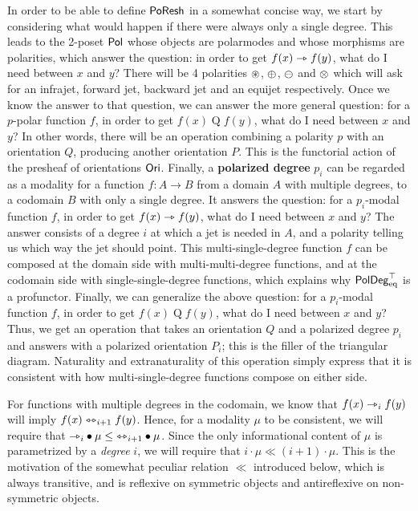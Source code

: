 \documentclass[a4paper]{memoir}
\begin{document}
In order to be able to define $\mathsf{PoResh}$ in a somewhat concise way, we start by considering what would happen if there were always only a single degree.
This leads to the 2-poset ${\mathsf{Pol}}$ whose objects are polarmodes and whose morphisms are polarities, which answer the question: in order to get $f(x) \rightarrowtriangle f(y)$, what do I need between $x$ and $y$?
There will be 4 polarities ${\oast}$, ${\oplus}$, ${\ominus}$ and ${\otimes}$ which will ask for an infrajet, forward jet, backward jet and an equijet respectively.
Once we know the answer to that question, we can answer the more general question: for a $p$-polar function $f$, in order to get $f(x) \mathrel{Q} f(y)$, what do I need between $x$ and $y$?
In other words, there will be an operation combining a polarity $p$ with an orientation $Q$, producing another orientation $P$. This is the functorial action of the presheaf of orientations ${\mathsf{Ori}}$.
Finally, a \textbf{polarized degree} $p_i$ can be regarded as a modality for a function $f : A \to B$ from a domain $A$ with multiple degrees, to a codomain $B$ with only a single degree. It answers the question: for a $p_i$-modal function $f$, in order to get $f(x) \rightarrowtriangle f(y)$, what do I need between $x$ and $y$?
The answer consists of a degree $i$ at which a jet is needed in $A$, and a polarity telling us which way the jet should point.
This multi-single-degree function $f$ can be composed at the domain side with multi-multi-degree functions, and at the codomain side with single-single-degree functions, which explains why $\mathsf{PolDeg}_{\mathrm{eq}}^\top$ is a profunctor.
Finally, we can generalize the above question: for a $p_i$-modal function $f$, in order to get $f(x) \mathrel{Q} f(y)$, what do I need between $x$ and $y$? Thus, we get an operation that takes an orientation $Q$ and a polarized degree $p_i$ and answers with a polarized orientation $P_i$; this is the filler of the triangular diagram.
Naturality and extranaturality of this operation simply express that it is consistent with how multi-single-degree functions compose on either side.

For functions with multiple degrees in the codomain, we know that $f(x) \rightarrowtriangle_i f(y)$ will imply $f(x) \leftrightarrowtriangle_{i+1} f(y)$.
Hence, for a modality $\mu$ to be consistent, we will require that ${\rightarrowtriangle}_i \mathbin{\bullet} \mu \leq {\leftrightarrowtriangle}_{i+1} \mathbin{\bullet} \mu$.
Since the only informational content of $\mu$ is parametrized by a \emph{degree} $i$, we will require that $i \cdot \mu \ll (i+1) \cdot \mu$.
This is the motivation of the somewhat peculiar relation $\ll$ introduced below, which is always transitive, and is reflexive on symmetric objects and antireflexive on non-symmetric objects.
\end{document}
